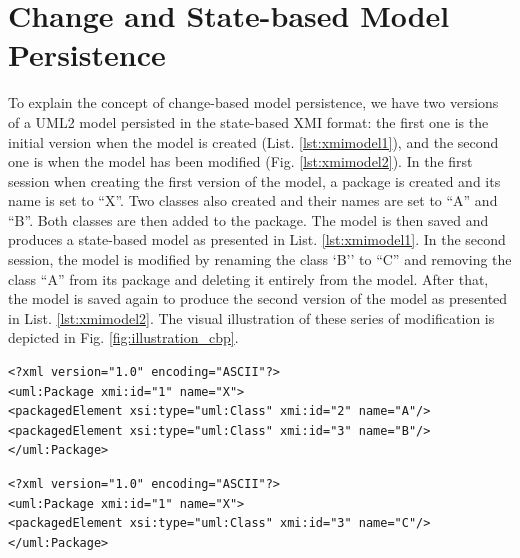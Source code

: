 \documentclass[10pt,conference]{IEEEtran}
\begin{document}
\section{Change and State-based Model Persistence}
\label{sec:change_and_state_based_model_persistence}
To explain the concept of change-based model persistence, we have two versions of a UML2 \cite{eclipse2017uml2} model persisted in the state-based XMI format: the first one is the initial version when the model is created (List. \ref{lst:xmimodel1}), and the second one is when the model has been modified (Fig. \ref{lst:xmimodel2}). In the first session when creating the first version of the model, a package is created and its name is set to ``X''. Two classes also created and their names are set to ``A'' and ``B''. Both classes are then added to the package. The model is then saved and produces a state-based model as presented in List. \ref{lst:xmimodel1}. In the second session, the model is modified by renaming the class `B'' to ``C'' and removing the class ``A'' from its package and deleting it entirely from the model. After that, the model is saved again to produce the second version of the model as presented in List. \ref{lst:xmimodel2}. The visual illustration of these series of modification is depicted in Fig. \ref{fig:illustration_cbp}.

\begin{lstlisting}[style=xmi,caption={The first version of the UML2 example model in XMI format after the first session.},label=lst:xmimodel1]
<?xml version="1.0" encoding="ASCII"?>
<uml:Package xmi:id="1" name="X">
<packagedElement xsi:type="uml:Class" xmi:id="2" name="A"/>
<packagedElement xsi:type="uml:Class" xmi:id="3" name="B"/>
</uml:Package>
\end{lstlisting}

\begin{lstlisting}[style=xmi,caption={The second version of the UML2 example model in XMI format after the second session.},label=lst:xmimodel2]
<?xml version="1.0" encoding="ASCII"?>
<uml:Package xmi:id="1" name="X">
<packagedElement xsi:type="uml:Class" xmi:id="3" name="C"/>
</uml:Package>
\end{lstlisting}
\end{document}
